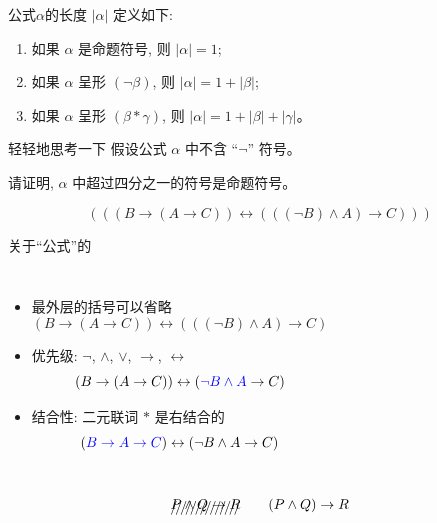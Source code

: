 \begin{frame}{}
  \begin{center}
  \end{center}

  \begin{definition}[公式的长度]
    公式$\alpha$的长度 $|\alpha|$ 定义如下: \\[3pt]
    \begin{enumerate}[(1)]
      \setlength{\itemsep}{8pt}
      \item 如果 $\alpha$ 是命题符号, 则 $|\alpha| = 1$;
      \item 如果 $\alpha$ 呈形 $(\lnot \beta)$, 则 $|\alpha| = 1 + |\beta|$;
      \item 如果 $\alpha$ 呈形 $(\beta \ast \gamma)$, 则 $|\alpha| = 1 + |\beta| + |\gamma|$。
    \end{enumerate}
  \end{definition}

  \pause
  \vspace{0.30cm}
  \begin{exampleblock}{轻轻地思考一下}
    假设公式 $\alpha$ 中不含 ``$\lnot$'' 符号。

    请证明, $\alpha$ 中超过四分之一的符号是命题符号。
  \end{exampleblock}
\end{frame}

\begin{frame}{}
  \[
    (((B \to (A \to C)) \leftrightarrow (((\lnot B) \land A) \to C)))
  \]

  \pause
  \vspace{0.20cm}
  \begin{center}
    关于``公式''的
    \pause
    \begin{columns}
        \begin{itemize}[<+->]
          \setlength{\itemsep}{6pt}
          \item 最外层的括号可以省略
            \[
              (B \to (A \to C)) \leftrightarrow (((\lnot B) \land A) \to C)
            \]
          \item 优先级: $\lnot$, $\land$, $\lor$, $\to$, $\leftrightarrow$
            \[
              (B \to (A \to C)) \leftrightarrow (\textcolor{blue}{\lnot B \land A} \to C)
            \]
          \item 结合性: 二元联词 $\ast$ 是右结合的
            \[
              (\textcolor{blue}{B \to A \to C}) \leftrightarrow (\lnot B \land A \to C)
            \]
        \end{itemize}
    \end{columns}

    \pause
    \vspace{-0.30cm}
    \[
      \xout{P \land Q \to R} \qquad
      (P \land Q) \to R
    \]
  \end{center}
\end{frame}

